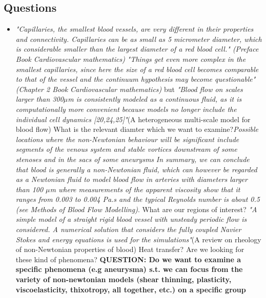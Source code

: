 \documentclass[11pt,letterpaper]{article}
\begin{document}
\newpage
\subsection*{Questions}
\begin{itemize}
    \item  \textit{"Capillaries, the smallest blood vessels, are very different in their properties and connectivity. Capillaries can be as small as 5 micrometer diameter, which is considerable smaller than the largest diameter of a red blood cell." (Preface Book Cardiovascular mathematics)} \newline
    \textit{"Things get even more complex in the smallest capillaries, since here the size of a red blood cell becomes comparable to that of the vessel and the continuum hypothesis may become questionable" (Chapter 2 Book Cardiovascular mathematics)}\newline
    but \textit{"Blood flow on scales larger than 300$\mu$m is consistently modeled as a continuous fluid, as it is computationally more convenient because models no longer include the individual cell dynamics [20,24,25]"}(A heterogeneous multi-scale model for blood flow)
\newline
{\color{red}What is the relevant diamter which we want to examine?}\newline \textit{Possible locations where the non-Newtonian behaviour will be significant include segments of the venous system and stable vortices downstream of some stenoses and in the sacs of some aneurysms} \textit{In summary, we can conclude that blood is generally a non-Newtonian fluid, which can however be
regarded as a Newtonian fluid to model blood flow in arteries with diameters larger than 100 $\mu$m where measurements of the apparent viscosity show that it ranges from 0.003 to 0.004 Pa.s and the typical Reynolds number is about 0.5 (see Methods of Blood Flow Modelling)}.\newline
{\color{red} What are our regions of interest?} \newline \textit{"A simple model of a straight rigid blood vessel with unsteady periodic flow is considered. A numerical solution that considers the fully coupled Navier Stokes and energy equations is used for the simulations"}(A review on rheology of non-Newtonian properties of blood) \newline
{\color{red}Heat transfer?}
{\color{red} Are we looking for these kind of phenomena?} \newline\newline
{\color{red}\textbf{QUESTION: Do we want to examine a specific phenomena (e.g aneurysma) s.t. we can focus from the variety of non-newtonian models (shear thinning, plasticity, viscoelasticity, thixotropy, all together, etc.) on a specific group }   }


\end{itemize}
\end{document}
